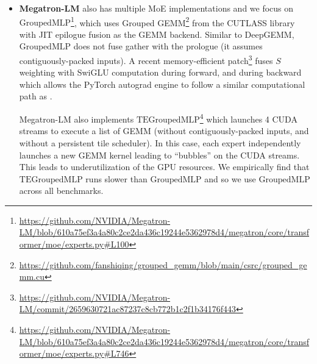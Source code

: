 \begin{itemize}
    \item \textbf{Megatron-LM} \citep{shoeybi2019megatron} also has multiple MoE implementations and we focus on $\mathrm{GroupedMLP}$\footnote{\scriptsize\url{https://github.com/NVIDIA/Megatron-LM/blob/610a75ef3a4a80c2ce2da436c19244e5362978d4/megatron/core/transformer/moe/experts.py\#L100}},  which uses Grouped GEMM\footnote{\scriptsize \url{https://github.com/fanshiqing/grouped_gemm/blob/main/csrc/grouped_gemm.cu}} from the CUTLASS library \citep{CUTLASS_gemm} with JIT epilogue fusion as the GEMM backend. Similar to DeepGEMM, $\mathrm{GroupedMLP}$ does not fuse gather with the prologue (it assumes contiguously-packed inputs). A recent memory-efficient patch\footnote{\scriptsize \url{https://github.com/NVIDIA/Megatron-LM/commit/2659630721ac87237c8cb772b1c2f1b34176f443}} fuses $S$ weighting with SwiGLU computation during forward, and during backward which allows the PyTorch autograd engine \citep{paszke2019pytorchimperativestylehighperformance} to follow a similar computational path as \Algname.%

    Megatron-LM also implements $\mathrm{TEGroupedMLP}$\footnote{\scriptsize\url{https://github.com/NVIDIA/Megatron-LM/blob/610a75ef3a4a80c2ce2da436c19244e5362978d4/megatron/core/transformer/moe/experts.py\#L746}} which launches 4 CUDA streams to execute a list of GEMM (without contiguously-packed inputs, and without a persistent tile scheduler). In this case, each expert independently launches a new GEMM kernel leading to ``bubbles'' on the CUDA streams. This leads to underutilization of the GPU resources. We empirically find that $\mathrm{TEGroupedMLP}$ runs slower than $\mathrm{GroupedMLP}$ and so we use $\mathrm{GroupedMLP}$ across all benchmarks.


\end{itemize}
